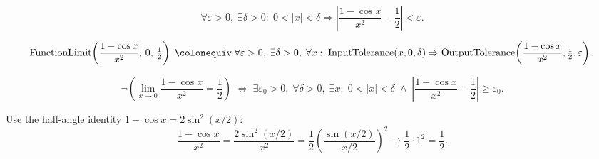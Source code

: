 \begin{remark*}
\[
  \forall\varepsilon>0,\;\exists\delta>0:\;
  0<|x|<\delta \Rightarrow
  \left|\frac{1-\cos x}{x^2}-\frac{1}{2}\right|<\varepsilon.
\]
\end{remark*}

\begin{remark*}
\[
  \operatorname{FunctionLimit}\!\left(\frac{1-\cos x}{x^2},\,0,\,\tfrac{1}{2}\right)
  \;\colonequiv\;
  \forall\varepsilon>0,\;\exists\delta>0,\;\forall x:\;
  \operatorname{InputTolerance}(x,0,\delta)
  \Rightarrow
  \operatorname{OutputTolerance}\!\left(\frac{1-\cos x}{x^2},\tfrac{1}{2},\varepsilon\right).
\]
\end{remark*}

\begin{remark*}
\[
  \neg\left(\lim_{x\to 0}\frac{1-\cos x}{x^2}=\frac{1}{2}\right)
  \;\iff\;
  \exists\varepsilon_0>0,\;\forall\delta>0,\;\exists x:\;
  0<|x|<\delta \;\wedge\;
  \left|\frac{1-\cos x}{x^2}-\frac{1}{2}\right|\geq\varepsilon_0.
\]
\end{remark*}

\begin{remark*}
Use the half-angle identity $1 - \cos x = 2\sin^2(x/2)$:
\[
  \frac{1 - \cos x}{x^2}
  = \frac{2\sin^2(x/2)}{x^2}
  = \frac{1}{2}\left(\frac{\sin(x/2)}{x/2}\right)^2
  \to \frac{1}{2} \cdot 1^2 = \frac{1}{2}.
\]
\end{remark*}

